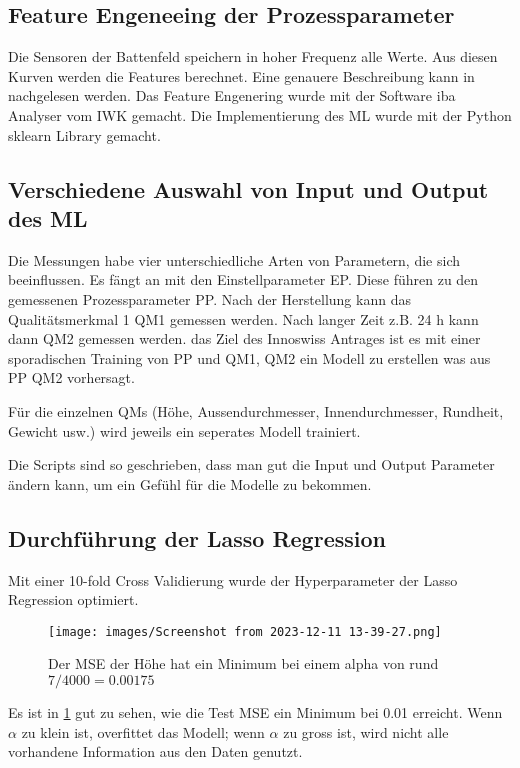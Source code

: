 \subsection{Feature Engeneeing der Prozessparameter}
Die Sensoren der Battenfeld speichern in hoher Frequenz alle Werte. Aus diesen Kurven werden die Features berechnet. Eine genauere Beschreibung kann in \cite{VorlesungSML} nachgelesen werden. Das Feature Engenering wurde mit der Software iba Analyser vom IWK gemacht. Die Implementierung des ML wurde mit der Python sklearn Library gemacht.

\subsection{Verschiedene Auswahl von Input und Output des ML}
Die Messungen habe vier unterschiedliche Arten von Parametern, die sich beeinflussen. Es fängt an mit den Einstellparameter EP. Diese führen zu den gemessenen Prozessparameter PP. Nach der Herstellung kann das Qualitätsmerkmal 1 QM1 gemessen werden. Nach langer Zeit z.B. 24 h kann dann QM2 gemessen werden. das Ziel des Innoswiss Antrages ist es mit einer sporadischen Training von PP und QM1, QM2 ein Modell zu erstellen was aus PP  QM2 vorhersagt.

Für die einzelnen QMs (Höhe, Aussendurchmesser, Innendurchmesser, Rundheit, Gewicht usw.) wird jeweils ein seperates Modell trainiert.

Die Scripts sind so geschrieben, dass man gut die Input und Output Parameter ändern kann, um ein Gefühl für die Modelle zu bekommen.

\subsection{Durchführung der Lasso Regression}
Mit einer 10-fold Cross Validierung wurde der Hyperparameter der Lasso Regression optimiert.


\begin{figure} 
   
  \texttt{[image: images/Screenshot from 2023-12-11 13-39-27.png]}
  \caption{Der MSE der Höhe hat ein Minimum bei einem alpha von rund  $7 / 4000 = 0.00175$}
  \label{fig:CVAlpha}
\end{figure}


Es ist in \ref{fig:CVAlpha} gut zu sehen, wie die Test MSE ein Minimum bei 0.01 erreicht. Wenn $\alpha$ zu klein ist, overfittet das Modell; wenn $\alpha$ zu gross ist, wird nicht alle vorhandene Information aus den Daten genutzt.


